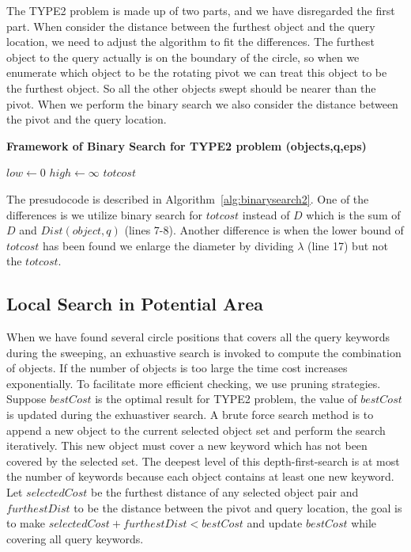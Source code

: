 \documentclass{sig-alternate}
\begin{document}
The \textsf{TYPE2} problem is made up of two parts, and we have disregarded the
first part. When consider the distance between the furthest object and the query location,
we need to adjust the algorithm to fit the differences. The furthest object to the
query actually is on the boundary of the circle, so when we enumerate which object
to be the rotating pivot we can treat this object to be the furthest object. So all
the other objects swept should be nearer than the pivot. When we perform the binary search
we also consider the distance between the pivot and the query location.

\begin{algorithm}[!ht]\small\label{alg:binarysearch2}
\caption{ \bf {Framework of Binary Search for TYPE2 problem} (objects,q,eps)}

$low \gets 0$\;
$high \gets \infty$\;
\Return $totcost$\;\vspace{-1ex}

\end{algorithm}

The presudocode is described in Algorithm~\ref{alg:binarysearch2}. One of the differences
is we utilize binary search for $totcost$ instead of $D$ which is the sum of $D$ and $Dist(object,q)$ (lines 7-8).
Another difference is when the lower bound of $totcost$ has been found we enlarge the diameter by dividing $\lambda$ (line 17)
but not the $totcost$.

\subsection{Local Search in Potential Area}\label{subsec:type2:search}
When we have found several circle positions that covers all the query keywords during the sweeping,
an exhuastive search is invoked to compute the combination of objects. If the number of objects
is too large the time cost increases exponentially. To facilitate more efficient checking,
we use pruning strategies. Suppose $bestCost$ is the optimal result for \textsf{TYPE2} problem,
the value of $bestCost$ is updated during the exhuastiver search. 
A brute force search method is to append a new object to the current selected object set and
perform the search iteratively.
This new object must cover a new keyword which has not been covered by the selected set.
The deepest level of this depth-first-search is at most the number of keywords because each object
contains at least one new keyword.
Let $selectedCost$ be the furthest distance of any selected object pair and
$furthestDist$ to be the distance between the pivot and query location, the goal is to
make $selectedCost+furthestDist<bestCost$ and update $bestCost$ while covering all query keywords.
%
\end{document}
